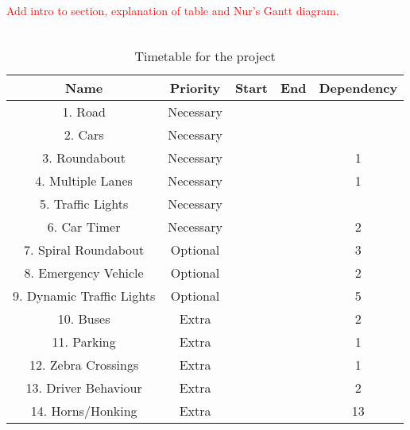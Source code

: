 \documentclass{article}
\begin{document}
\textcolor{red}{Add intro to section, explanation of table and Nur's Gantt diagram.}\\\\
\begin{table}[H]
	\centering
	\label{TimetableForTheProject}
\begin{tabular}{|c|c|c|c|c|}
	\hline {\bf Name} & {\bf Priority} & {\bf Start} & {\bf End} & {\bf Dependency} \\ 
	\hline 1. Road & Necessary &  &  &  \\ 
	\hline 2. Cars& Necessary &  &  &  \\ 
	\hline 3. Roundabout & Necessary &  &  & 1 \\ 
	\hline 4. Multiple Lanes & Necessary &  &  & 1 \\ 
	\hline 5. Traffic Lights & Necessary &  &  &  \\ 
	\hline 6.  Car Timer & Necessary &  &  & 2 \\ 
	\hline 7. Spiral Roundabout & Optional &  &  & 3 \\ 
	\hline 8. Emergency Vehicle & Optional &  &  & 2 \\ 
	\hline 9. Dynamic Traffic Lights & Optional &  &  & 5 \\ 
	\hline 10. Buses& Extra &  &  & 2 \\ 
	\hline  11. Parking & Extra &  &  & 1 \\ 
	\hline  12. Zebra Crossings & Extra &  &  & 1 \\ 
	\hline 13. Driver Behaviour & Extra &  &  & 2 \\ 
	\hline 14. Horns/Honking & Extra &  &  & 13 \\ 
	\hline 
\end{tabular} 
\caption{Timetable for the project}
\end{table}

\begin{figure}
	\centering
\end{figure}

\end{document}
